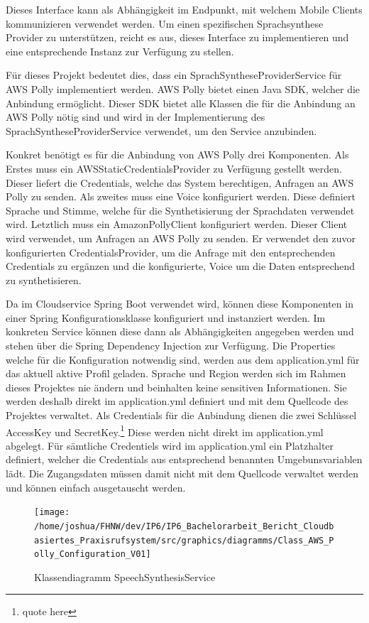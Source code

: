 Dieses Interface kann als Abhängigkeit im Endpunkt, mit welchem Mobile Clients kommunizieren verwendet werden.
Um einen spezifischen Sprachsynthese Provider zu unterstützen, reicht es aus, dieses Interface zu implementieren und eine entsprechende Instanz zur Verfügung zu stellen.

Für dieses Projekt bedeutet dies, dass ein SprachSyntheseProviderService für AWS Polly implementiert werden.
AWS Polly bietet einen Java SDK, welcher die Anbindung ermöglicht.
Dieser SDK bietet alle Klassen die für die Anbindung an AWS Polly nötig sind und wird in der Implementierung des SprachSyntheseProviderService verwendet, um den Service anzubinden.

Konkret benötigt es für die Anbindung von AWS Polly drei Komponenten.
Als Erstes muss ein AWSStaticCredentialsProvider zu Verfügung gestellt werden.
Dieser liefert die Credentials, welche das System berechtigen, Anfragen an AWS Polly zu senden.
Als zweites muss eine Voice konfiguriert werden.
Diese definiert Sprache und Stimme, welche für die Synthetisierung der Sprachdaten verwendet wird.
Letztlich muss ein AmazonPollyClient konfiguriert werden.
Dieser Client wird verwendet, um Anfragen an AWS Polly zu senden.
Er verwendet den zuvor konfigurierten CredentialsProvider, um die Anfrage mit den entsprechenden Credentials zu ergänzen
und die konfigurierte, Voice um die Daten entsprechend zu synthetisieren.

Da im Cloudservice Spring Boot verwendet wird, können diese Komponenten in einer Spring Konfigurationsklasse konfiguriert und instanziert werden.
Im konkreten Service können diese dann als Abhängigkeiten angegeben werden und stehen über die Spring Dependency Injection zur Verfügung.
Die Properties welche für die Konfiguration notwendig sind, werden aus dem application.yml für das aktuell aktive Profil geladen.
Sprache und Region werden sich im Rahmen dieses Projektes nie ändern und beinhalten keine sensitiven Informationen.
Sie werden deshalb direkt im application.yml definiert und mit dem Quellcode des Projektes verwaltet.
Als Credentials für die Anbindung dienen die zwei Schlüssel AccessKey und SecretKey.\footnote{quote here}
Diese werden nicht direkt im application.yml abgelegt.
Für sämtliche Credentiels wird im application.yml ein Platzhalter definiert, welcher die Credentials aus entsprechend benannten Umgebunsvariablen lädt.
Die Zugangsdaten müssen damit nicht mit dem Quellcode verwaltet werden und können einfach ausgetauscht werden.

\begin{figure}[h]
    \centering
    \begin{minipage}[b]{0.8\textwidth}
        \texttt{[image: /home/joshua/FHNW/dev/IP6/IP6\_Bachelorarbeit\_Bericht\_Cloudbasiertes\_Praxisrufsystem/src/graphics/diagramms/Class\_AWS\_Polly\_Configuration\_V01]}
        \caption{Klassendiagramm SpeechSynthesisService}
    \end{minipage}
\end{figure}

